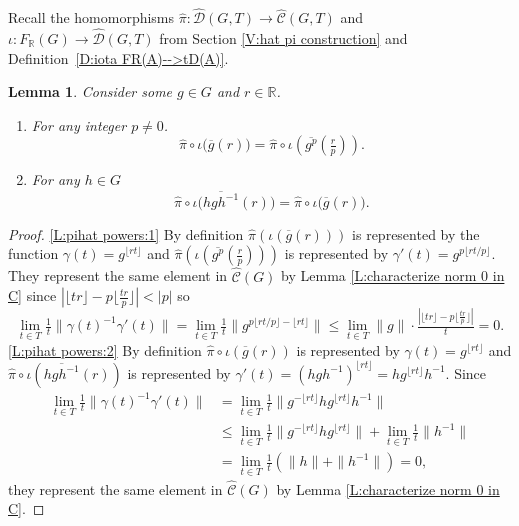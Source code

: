 \documentclass[12pt]{amsart}
\newtheorem{lemma}[prop]{Lemma}
\theoremstyle{definition}
\def\RR{\ensuremath{\mathbb{R}}}
\def\Free{F}
\def\D{\mathcal{D}}
\def\tC{\hat{\mathcal{C}}}
\def\tD{\hat{\D}}
\newcommand{\Myfloor}[1]{\lfloor #1 \rfloor}
\newcommand{\myfloor}[1]{\llfloor #1 \rrfloor}
\begin{document}
Recall the homomorphisms $\hat{\pi} \colon \tD(G,T) \to \tC(G,T)$ and $\iota \colon \Free_\RR(G) \to \tD(G,T)$ from Section \ref{V:hat pi construction} and Definition~\ref{D:iota FR(A)-->tD(A)}.



\begin{lemma}\label{L:pihat powers}
Consider some $g \in G$ and $r \in \RR$.
\begin{enumerate}[label=(\roman*)]
\item\label{L:pihat powers:1}
For any integer $p \neq 0$.
\[
\hat{\pi} \circ \iota\Big(\overline{g}(r)\Big) = \hat{\pi} \circ \iota \left(\overline{g^p}(\tfrac{r}{p})\right).
\]

\item\label{L:pihat powers:2}
For any $h \in G$ 
\[
\hat{\pi} \circ \iota\Big(\overline{hgh^{-1}}(r)\Big) = \hat{\pi} \circ \iota\Big(\overline{g}(r)\Big).
\]
\end{enumerate}
\end{lemma}

\begin{proof}
\ref{L:pihat powers:1}
By definition $\hat{\pi}(\iota(\overline{g}(r)))$ is represented by the function $\gamma(t)=g^{\Myfloor{rt}}$ and $\hat{\pi}(\iota (\overline{g^p}(\tfrac{r}{p})))$ is represented by $\gamma'(t) = g^{p \Myfloor{rt/p}}$.
They represent the same element in $\tC(G)$ by Lemma \ref{L:characterize norm 0 in C} since $| \Myfloor{tr} - p\Myfloor{\tfrac{tr}{p}} | < |p|$ so 
\[
\lim_{t \in T} \tfrac{1}{t}\| \gamma(t)^{-1} \gamma'(t)\| =
\lim_{t \in T} \tfrac{1}{t}\| g^{p \Myfloor{rt/p} - \Myfloor{rt}} \| \leq
\lim_{t \in T}  \|g\| \cdot \tfrac{|\Myfloor{tr} - p \Myfloor{\tfrac{tr}{p}}|}{t} = 0.
\]
\ref{L:pihat powers:2}
By definition $\hat{\pi} \circ \iota(\overline{g}(r))$ is represented by $\gamma(t)=g^{\Myfloor{rt}}$ and $\hat{\pi} \circ \iota(\overline{hgh^{-1}}(r))$ is represented by $\gamma'(t)=(hgh^{-1})^{\Myfloor{rt}}=hg^{\Myfloor{rt}}h^{-1}$.
Since
\begin{align*}
\lim_{t \in T} \tfrac{1}{t}\|\gamma(t)^{-1}\gamma'(t)\| &=
\lim_{t \in T} \tfrac{1}{t}\| g^{-\Myfloor{rt}} hg^{\Myfloor{rt}}h^{-1}\| \\
& \leq
\lim_{t \in T} \tfrac{1}{t}\| g^{-\Myfloor{rt}} hg^{\Myfloor{rt}}\| + \lim_{t \in T} \tfrac{1}{t}\|h^{-1}\| \\
& =
\lim_{t \in T} \tfrac{1}{t}(\|h\|+\|h^{-1}\|)=0,
\end{align*}
they represent the same element in $\tC(G)$ by Lemma \ref{L:characterize norm 0 in C}.
\end{proof}
\end{document}
